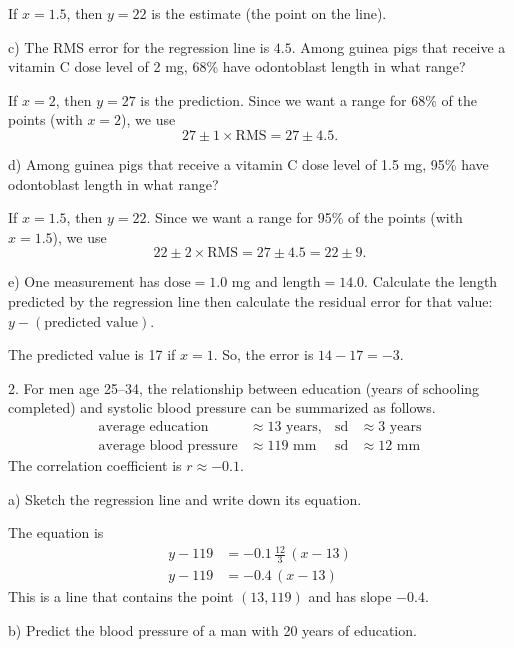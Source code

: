 \documentclass[10pt]{article}
\begin{document}
{\color{blue}  If $x=1.5$, then $y=22$ is the estimate (the point on the line).}
\bigskip

\hspace{20pt} c) The RMS error for the regression line is $4.5$.
Among guinea pigs that receive a vitamin C dose level of 2 mg, 68\% 
  have odontoblast length in what range?

{\color{blue} If $x=2$, then $y=27$ is the prediction.  Since we want 
a range for 68\% of the points (with $x=2$), we 
use \[27\pm 1\times \mbox{RMS}=27\pm 4.5.\]}

  \hspace{20pt} d) 
Among guinea pigs that receive a vitamin C dose level of 1.5 mg, 95\% 
  have odontoblast length in what range?

{\color{blue} If $x=1.5$, then $y=22$. Since we want a range for
95\% of the points (with $x=1.5$), we 
use \[22\pm 2\times \mbox{RMS}=27\pm 4.5 = 22\pm 9.\]}

\hspace{20pt} e) One measurement has $\mbox{dose}=1.0$ mg and 
$\mbox{length}=14.0$. Calculate the length predicted by the regression
line then calculate the  residual error for that value: $y - (\mbox{predicted value})$.

{\color{blue} The predicted value is 17 if $x=1$.  So, the error is 
$14-17 = -3$.  }
\vfill
\eject

2. For men age 25--34, the relationship between education (years of schooling
completed) and systolic blood pressure can be summarized as follows.
\begin{align*}
\mbox{average education} &\approx 13 \mbox{ years},
  & \mbox{sd} &\approx 3 \mbox{ years}\\
\mbox{average blood pressure} &\approx 119 \mbox{ mm}
  & \mbox{sd} &\approx 12 \mbox{ mm}
\end{align*}
The correlation coefficient is $r\approx -0.1$.

\hspace{20pt} a) Sketch the regression line and write down its equation.

{\color{blue} The equation is\vspace{-15pt}
\begin{align*}
y - 119 &= -0.1\,\frac{12}{3}\,(x-13)\\
y - 119 &= -0.4\,(x-13)
\end{align*}
This is a line that contains the point $(13, 119)$ and has slope $-0.4$.}
\bigskip

\hspace{20pt} b) Predict the blood pressure of a man with 20 years of education.
\end{document}

